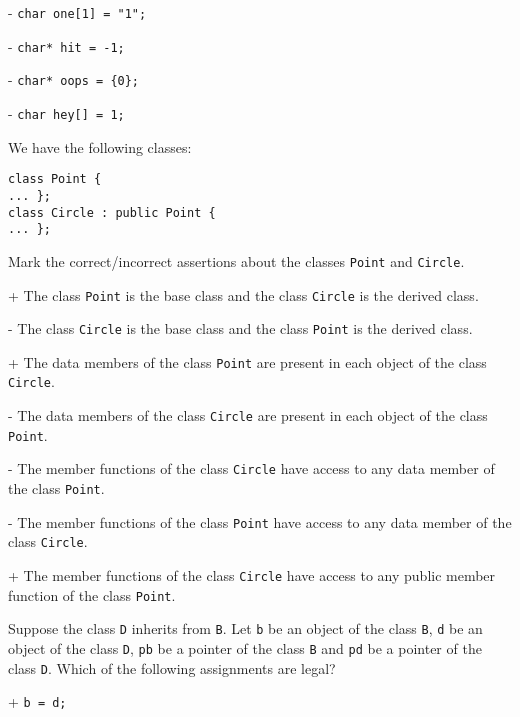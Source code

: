 - \verb|char one[1] = "1";|

- \verb|char* hit = -1;|

- \verb|char* oops = {0};|

- \verb|char hey[] = 1;|

We have the following classes:
 \vspace{-3mm}\begin{verbatim}
class Point {
... };
class Circle : public Point {
... };
 \end{verbatim}\vspace{-6mm}
Mark the correct/incorrect assertions about the classes
\verb|Point| and \verb|Circle|.

+ The class \verb|Point| is the base class and the class \verb|Circle| is the derived class.

- The class \verb|Circle| is the base class and the class \verb|Point| is the derived class.

+ The data members of the class \verb|Point| are present in each object of the class \verb|Circle|.

- The data members of the class \verb|Circle| are present in each object of the class \verb|Point|.

- The member functions of the class \verb|Circle| have access to any data member of the class \verb|Point|.

- The member functions of the class \verb|Point| have access to any data member of the class \verb|Circle|.

+ The member functions of the class \verb|Circle| have access to any public member function of the class \verb|Point|.

Suppose the class \verb|D| inherits from \verb|B|. Let
\verb|b| be an object of the class \verb|B|,
\verb|d| be an object of the class \verb|D|,
\verb|pb| be a pointer of the class \verb|B| and
\verb|pd| be a pointer of the class \verb|D|.
Which of the following assignments are legal?

+ \verb|b = d;|

